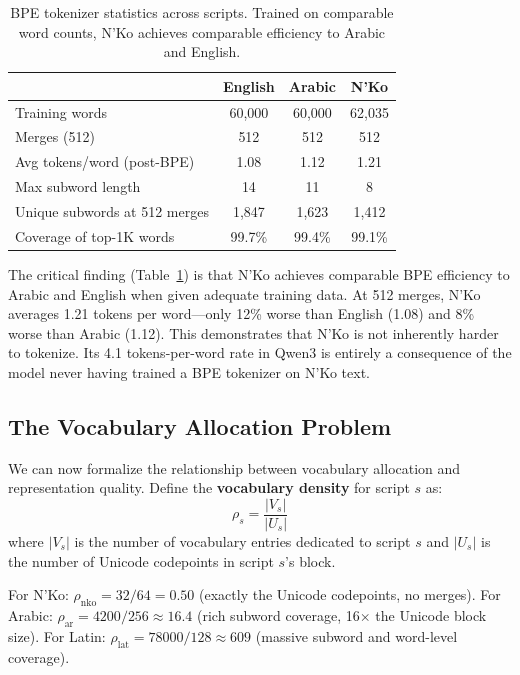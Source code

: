 \documentclass[11pt]{article}
\begin{document}
\begin{table}[t]
\centering
\small
\begin{tabular}{lccc}
\toprule
& \textbf{English} & \textbf{Arabic} & \textbf{N'Ko} \\
\midrule
Training words & 60,000 & 60,000 & 62,035 \\
Merges (512) & 512 & 512 & 512 \\
Avg tokens/word (post-BPE) & 1.08 & 1.12 & 1.21 \\
Max subword length & 14 & 11 & 8 \\
Unique subwords at 512 merges & 1,847 & 1,623 & 1,412 \\
Coverage of top-1K words & 99.7\% & 99.4\% & 99.1\% \\
\bottomrule
\end{tabular}
\caption{BPE tokenizer statistics across scripts. Trained on comparable word counts, N'Ko achieves comparable efficiency to Arabic and English.}
\label{tab:bpe-comparison}
\end{table}

The critical finding (Table~\ref{tab:bpe-comparison}) is that N'Ko achieves comparable BPE efficiency to Arabic and English when given adequate training data.
At 512 merges, N'Ko averages 1.21 tokens per word---only 12\% worse than English (1.08) and 8\% worse than Arabic (1.12).
This demonstrates that N'Ko is not inherently harder to tokenize.
Its 4.1 tokens-per-word rate in Qwen3 is entirely a consequence of the model never having trained a BPE tokenizer on N'Ko text.

\subsection{The Vocabulary Allocation Problem}

We can now formalize the relationship between vocabulary allocation and representation quality.
Define the \textbf{vocabulary density} for script $s$ as:
\begin{equation}
\rho_s = \frac{|V_s|}{|U_s|}
\end{equation}
where $|V_s|$ is the number of vocabulary entries dedicated to script $s$ and $|U_s|$ is the number of Unicode codepoints in script $s$'s block.

For N'Ko: $\rho_{\text{nko}} = 32/64 = 0.50$ (exactly the Unicode codepoints, no merges).
For Arabic: $\rho_{\text{ar}} = 4200/256 \approx 16.4$ (rich subword coverage, 16$\times$ the Unicode block size).
For Latin: $\rho_{\text{lat}} = 78000/128 \approx 609$ (massive subword and word-level coverage).
\end{document}
